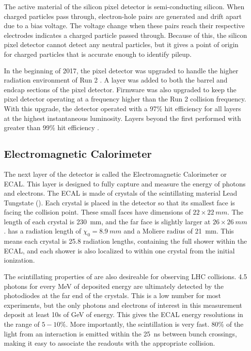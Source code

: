 The active material of the silicon pixel detector is semi-conducting silicon.
When charged particles pass through, electron-hole pairs are generated and drift apart due to a bias voltage.
The voltage change when these pairs reach their respective electrodes indicates a charged particle passed through.
Because of this, the silicon pixel detector cannot detect any neutral particles,
but it gives a point of origin for charged particles that is accurate enough to identify pileup.

In the beginning of 2017, the pixel detector was upgraded to handle the higher radiation environment of Run 2 \cite{Dominguez:1481838}.
A layer was added to both the barrel and endcap sections of the pixel detector.
Firmware was also upgraded to keep the pixel detector operating at a frequency higher than the Run 2 collision frequency.
With this upgrade, the detector operated with a 97\% hit efficiency for all layers at the highest instantaneous luminosity.
Layers beyond the first performed with greater than 99\% hit efficiency \cite{Modak:2712284}.

\subsection{Electromagnetic Calorimeter} \label{sec:ecal}

The next layer of the detector is called the Electromagnetic Calorimeter or ECAL.
This layer is designed to fully capture and measure the energy of photons and electrons.
The ECAL is made of crystals of the scintillating material Lead Tungstate ().
Each crystal is placed in the detector so that its smallest face is facing the collision point.
These small faces have dimensions of $22\times\SI{22}{mm}$.
The length of each crystal is \SI{230}{mm},
and the far face is slightly larger at $26\times\SI{26}{mm}$.
 has a radiation length of $\chi_0 = \SI{8.9}{mm}$ and a Moliere radius of \SI{21}{mm}.
This means each crystal is 25.8 radiation lengths, containing the full shower within the ECAL,
and each shower is also localized to within one crystal from the initial ionization.

The scintillating properties of  are also desireable for observing LHC collisions.
4.5 photons for every MeV of deposited energy are ultimately detected by the photodiodes at the far end of the crystals.
This is a low number for most experiments, but the only photons and electrons of interest in this measurement deposit at least 10s of GeV of energy.
This gives the ECAL energy resolutions in the range of $5-10\%$.
More importantly, the scintillation is very fast.
80\% of the light from an interaction is emitted within the \SI{25}{ns} between bunch crossings,
making it easy to associate the readouts with the appropriate collision.

